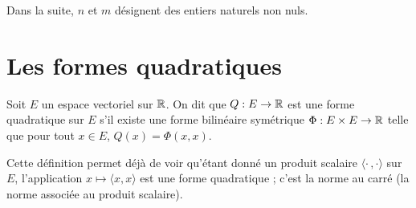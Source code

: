 \documentclass[11pt, a4paper]{article}
\begin{document}
\begin{nota}
  Dans la suite, $n$ et $m$ désignent des entiers naturels non nuls.
\end{nota}
\section{Les formes quadratiques}
\label{sec:FQ}

\begin{defn}
  Soit $E$ un espace vectoriel sur $\mathbb{R}$. On dit que $Q : E \to \mathbb{R}$ est une
  forme quadratique sur $E$ s'il existe une forme bilinéaire
  symétrique $\Phi: E\times E \to \mathbb{R}$ telle que pour tout $x \in E$,
  $Q(x) = \Phi(x, x)$.
\end{defn}
\noindent Cette définition permet déjà de voir qu'étant donné un
produit scalaire $\langle \cdot\, ,\cdot\rangle$ sur $E$, l'application
$x \mapsto \langle x, x \rangle$ est une forme quadratique ; c'est la
norme au carré (la norme associée au produit scalaire). 
\end{document}
